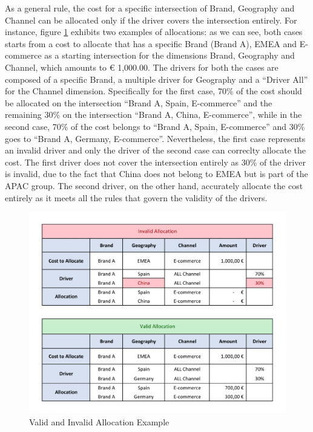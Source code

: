 \documentclass[12pt,a4paper,openright,twoside]{book}
\begin{document}
As a general rule, the cost for a specific intersection of Brand, Geography and Channel can be allocated only if the driver covers the intersection entirely.
%
For instance, figure \ref{fig:allocation} exhibits two examples of allocations: as we can see, both cases starts from a cost to allocate that has a specific Brand (Brand A), EMEA and E-commerce as a starting intersection for the dimensions Brand, Geography and Channel, which amounts to € 1,000.00.
%
The drivers for both the cases are composed of a specific Brand, a multiple driver for Geography and a ``Driver All'' for the Channel dimension.
%
Specifically for the first case, 70\% of the cost should be allocated on the intersection ``Brand A, Spain, E-commerce'' and the remaining 30\% on the intersection ``Brand A, China, E-commerce'', while in the second case, 70\% of the cost belongs to ``Brand A, Spain, E-commerce'' and 30\% goes to ``Brand A, Germany, E-commerce''.
%
Nevertheless, the first case represents an invalid driver and only the driver of the second case can correclty allocate the cost.
%
The first driver does not cover the intersection entirely as 30\% of the driver is invalid, due to the fact that China does not belong to EMEA but is part of the APAC group.
%
The second driver, on the other hand, accurately allocate the cost entirely as it meets all the rules that govern the validity of the drivers.

\begin{figure}[ht]
	\centering
	\includegraphics[width=\linewidth]{figures/allocation.pdf}
	\caption{Valid and Invalid Allocation Example}
	\label{fig:allocation}
\end{figure}
\end{document}
